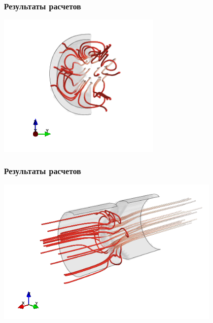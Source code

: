 \documentclass[14pt]{beamer}
\begin{document}
\begin{frame}
\frametitle{Результаты расчетов}
    \begin{center}
    \includegraphics[width=8cm]{valves_resized_with_bound_front.png}
    \end{center}
\end{frame}

\begin{frame}
\frametitle{Результаты расчетов}
    \begin{center}
	\includegraphics[width=11cm]{valves_resized_with_bound.png}
    \end{center}
\end{frame}
\end{document}
